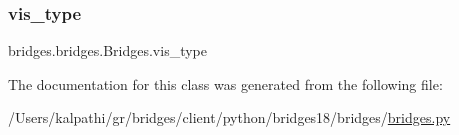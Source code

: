 \subsubsection{\texorpdfstring{vis\+\_\+type}{vis\_type}\hspace{0.1cm}{\footnotesize\ttfamily [2/2]}}
{\footnotesize\ttfamily bridges.\+bridges.\+Bridges.\+vis\+\_\+type}



The documentation for this class was generated from the following file\+:\begin{DoxyCompactItemize}
\item 
/\+Users/kalpathi/gr/bridges/client/python/bridges18/bridges/\mbox{\hyperlink{bridges_8py}{bridges.\+py}}\end{DoxyCompactItemize}
